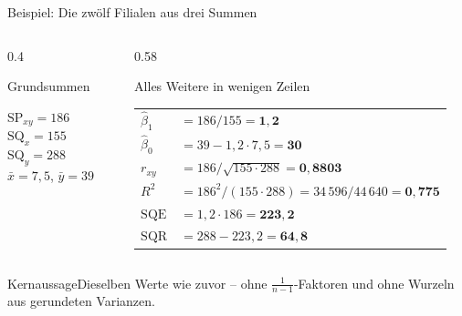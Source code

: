 \documentclass[aspectratio=169,11pt]{beamer}
\newcommand{\kernaussage}[1]{\begin{alertblock}{Kernaussage}#1\end{alertblock}}
\newcommand{\SQx}{\text{SQ}_x}
\newcommand{\SQy}{\text{SQ}_y}
\newcommand{\SPxy}{\text{SP}_{xy}}
\begin{document}
\begin{frame}{Beispiel: Die zwölf Filialen aus drei Summen}
  \begin{columns}[T]
    \begin{column}{0.4\textwidth}
      \begin{block}{Grundsummen}
        \begin{center}
          $\SPxy = 186$\\[3pt]
          $\SQx = 155$\\[3pt]
          $\SQy = 288$\\[3pt]
          $\bar{x} = 7{,}5$, \quad $\bar{y} = 39$
        \end{center}
      \end{block}
    \end{column}
    \begin{column}{0.58\textwidth}
      \begin{exampleblock}{Alles Weitere in wenigen Zeilen}
        \renewcommand{\arraystretch}{1.35}
        \begin{tabular}{@{}l@{\;}l@{}}
          $\hat{\beta}_1$ & $= 186 / 155 = \mathbf{1{,}2}$ \\
          $\hat{\beta}_0$ & $= 39 - 1{,}2 \cdot 7{,}5 = \mathbf{30}$ \\
          $r_{xy}$        & $= 186 / \sqrt{155 \cdot 288} = \mathbf{0{,}8803}$ \\
          $R^{2}$         & $= 186^{2} / (155 \cdot 288) = 34\,596 / 44\,640 = \mathbf{0{,}775}$ \\
          $\text{SQE}$  & $= 1{,}2 \cdot 186 = \mathbf{223{,}2}$ \\
          $\text{SQR}$  & $= 288 - 223{,}2 = \mathbf{64{,}8}$
        \end{tabular}
      \end{exampleblock}
    \end{column}
  \end{columns}

  \kernaussage{Dieselben Werte wie zuvor -- ohne $\frac{1}{n-1}$-Faktoren und
    ohne Wurzeln aus gerundeten Varianzen.}
\end{frame}
\end{document}
